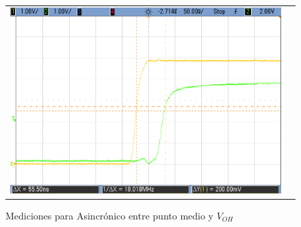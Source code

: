 \begin{figure}[H]
\begin{tabular}{c c}
            \includegraphics[scale=0.2]{../EJ7/Mediciones/Osciloscopio/Segundo_Intento/Asincronico/cropped_salida_q2.png}
        \end{tabular}
    \caption{Mediciones para Asincr\'onico entre punto medio y $V_{OH}$}
    \label{fig:asincronico_mediciones}
\end{figure}

